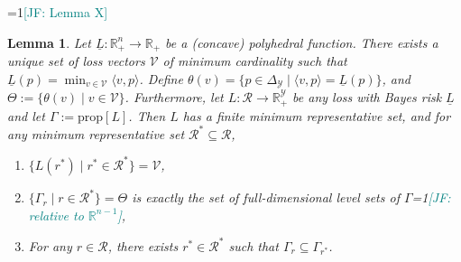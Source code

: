 \documentclass[11pt]{article}
\newcommand{\Comments}{1}
\newcommand{\mynote}[2]{\ifnum\Comments=1\textcolor{#1}{#2}\fi}
\newcommand{\jessie}[1]{\mynote{teal}{[JF: #1]}}
\newcommand{\reals}{\mathbb{R}}
\newcommand{\prop}[1]{\mathrm{prop}[#1]}
\newcommand{\simplex}{\Delta_\Y}
\newcommand{\R}{\mathcal{R}}
\newcommand{\V}{\mathcal{V}}
\newcommand{\Y}{\mathcal{Y}}
\newcommand{\risk}[1]{\underline{#1}}
\newcommand{\inprod}[2]{\langle #1, #2 \rangle}%
\newtheorem{lemma}{Lemma}
\begin{document}
\jessie{Lemma X}
\begin{lemma}
  Let $\risk L: \reals^n_+ \to \reals_+$ be a (concave) polyhedral function.
  There exists a unique set of loss vectors $\V$ of minimum cardinality such that $\risk L(p) = \min_{v \in \V} \inprod{v}{p}$.
  Define $\theta(v) = \{p \in \simplex \mid \inprod{v}{p} = \risk L(p)\}$, and $\Theta := \{\theta(v) \mid v \in \V\}$.
  Furthermore, let $L: \R \to \reals^\Y_+$ be any loss with Bayes risk $\risk L$ and let $\Gamma := \prop{L}$.
  Then $L$ has a finite minimum representative set, and for any minimum representative set $\R^* \subseteq \R$,
  \begin{enumerate}
  \item $\{L(r^*) \mid r^* \in \R^*\} = \V$,
  \item $\{\Gamma_r \mid r \in \R^*\} = \Theta$ is exactly the set of full-dimensional level sets of $\Gamma$\jessie{relative to $\reals^{n-1}$},
  \item For any $r \in \R$, there exists $r^* \in \R^*$ such that $\Gamma_r \subseteq \Gamma_{r^*}$.
  \end{enumerate}
\end{lemma}
\newcommand{\epi}{\mathrm{epi}}
\end{document}
